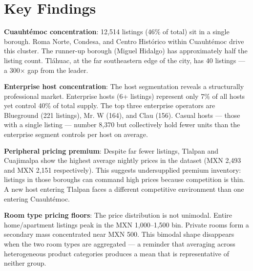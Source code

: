 \section{Key Findings}
\label{sec:airbnb-findings}

\begin{keyinsight}
  \textbf{Cuauhtémoc concentration}: 12,514 listings (46\% of total) sit in a single
  borough. Roma Norte, Condesa, and Centro Histórico within Cuauhtémoc drive this
  cluster. The runner-up borough (Miguel Hidalgo) has approximately half the listing
  count. Tláhuac, at the far southeastern edge of the city, has 40 listings — a
  300$\times$ gap from the leader.
\end{keyinsight}

\begin{keyinsight}
  \textbf{Enterprise host concentration}: The host segmentation reveals a structurally
  professional market. Enterprise hosts (6+ listings) represent only 7\% of all
  hosts yet control 40\% of total supply. The top three enterprise operators are
  Blueground (221 listings), Mr. W (164), and Clau (156). Casual hosts — those with
  a single listing — number 8,370 but collectively hold fewer units than the enterprise
  segment controls per host on average.
\end{keyinsight}

\begin{keyinsight}
  \textbf{Peripheral pricing premium}: Despite far fewer listings, Tlalpan and
  Cuajimalpa show the highest average nightly prices in the dataset (MXN 2,493 and
  MXN 2,151 respectively). This suggests undersupplied premium inventory: listings
  in those boroughs can command high prices because competition is thin. A new host
  entering Tlalpan faces a different competitive environment than one entering
  Cuauhtémoc.
\end{keyinsight}

\begin{keyinsight}
  \textbf{Room type pricing floors}: The price distribution is not unimodal. Entire
  home/apartment listings peak in the MXN 1,000--1,500 bin. Private rooms form a
  secondary mass concentrated near MXN 500. This bimodal shape disappears when the
  two room types are aggregated — a reminder that averaging across heterogeneous
  product categories produces a mean that is representative of neither group.
\end{keyinsight}

